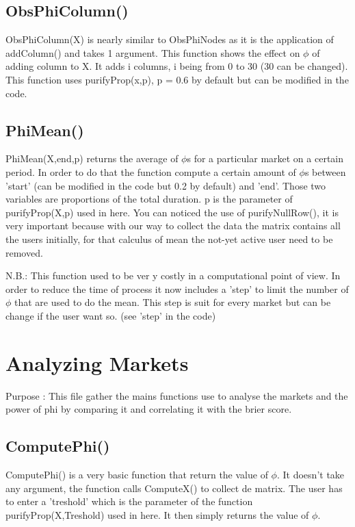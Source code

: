 \documentclass{report}
\begin{document}
\subsection{ObsPhiColumn()}

ObsPhiColumn(X) is nearly similar to ObsPhiNodes as it is the application of addColumn() and takes 1 argument. This function shows the effect on $\phi $ of adding column to X. It adds i columns, i being from 0 to 30 (30 can be changed). This function uses purifyProp(x,p), p = 0.6 by default but can be modified in the code. 

\subsection{PhiMean()}

PhiMean(X,end,p) returns the average of $\phi $s for a particular market on a certain period. In order to do that the function compute a certain amount of $\phi $s between 'start' (can be modified in the code but 0.2 by default) and 'end'. Those two variables are proportions of the total duration. p is the parameter of purifyProp(X,p) used in here. You can noticed the use of purifyNullRow(), it is very important because with our way to collect the data the matrix contains all the users initially, for that calculus of mean the not-yet active user need to be removed.

N.B.: This function used to be ver y costly in a computational point of view. In order to reduce the time of process it now includes a 'step' to limit the number of $\phi $ that are used to do the mean. This step is suit for every market but can be change if the user want so. (see 'step' in the code)

\section{Analyzing Markets}

Purpose : This file gather the mains functions use to analyse the markets and the power of phi by comparing it and correlating it with the brier score.

\subsection{ComputePhi()}

ComputePhi() is a very basic function that return the value of $\phi $. It doesn't take any argument, the function calls ComputeX() to collect de matrix. The user has to enter a 'treshold' which is the parameter of the function purifyProp(X,Treshold) used in here. It then simply returns the value of $\phi $.
\end{document}

